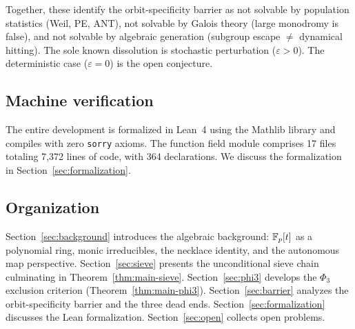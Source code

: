 Together, these identify the orbit-specificity barrier as not solvable by
population statistics (Weil, PE, ANT), not solvable by Galois theory
(large monodromy is false), and not solvable by algebraic generation
(subgroup escape $\neq$ dynamical hitting). The sole known dissolution
is stochastic perturbation ($\varepsilon > 0$). The deterministic case
($\varepsilon = 0$) is the open conjecture.

\subsection{Machine verification}

The entire development is formalized in Lean~4 using the Mathlib library
and compiles with zero \texttt{sorry} axioms. The function field module
comprises 17 files totaling 7{,}372 lines of code, with 364 declarations.
We discuss the formalization in Section~\ref{sec:formalization}.

\subsection{Organization}

Section~\ref{sec:background} introduces the algebraic background:
$\mathbb{F}_p[t]$ as a polynomial ring, monic irreducibles, the necklace identity,
and the autonomous map perspective. Section~\ref{sec:sieve} presents the
unconditional sieve chain culminating in Theorem~\ref{thm:main-sieve}.
Section~\ref{sec:phi3} develops the $\Phi_3$ exclusion criterion
(Theorem~\ref{thm:main-phi3}). Section~\ref{sec:barrier} analyzes the
orbit-specificity barrier and the three dead ends.
Section~\ref{sec:formalization} discusses the Lean formalization.
Section~\ref{sec:open} collects open problems.
